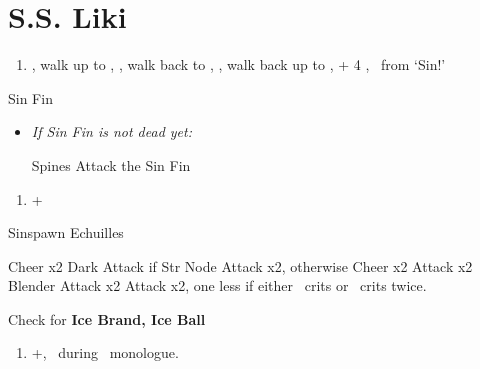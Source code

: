 \chapter{S.S. Liki}

\begin{enumerate}
    \item \cs[2:00], walk up to \yuna, \sd, walk back to \wakka, \sd, walk back up to \yuna, \cs + 4 \skippablefmv[4:20], \sd\ from `Sin!'
\end{enumerate}
\begin{battle}[2000]{Sin Fin}
    \begin{itemize}
        \tidusf Defend
        \switch{\yuna}{\lulu}
        \luluf Thunder the Sin Fin
        \switch{\kimahri}{\yuna}
        \summon{\valefor}
        \valeforf Energy Ray \od\ on Sin Fin
        \enemyf Move x2 and Spines x2
        \valeforf Thunder the Sin Fin
        \enemyf Spines and Move
        \valeforf Thunder the Sin Fin x2
        \item \textit{If Sin Fin is not dead yet:}
        \begin{itemize}
            \enemyf Spines
            \switch{\tidus}{\wakka}
            \wakkaf Attack the Sin Fin
        \end{itemize}
    \end{itemize}
\end{battle}
\begin{enumerate}[resume]
    \item \fmv+\cs[1:40]
\end{enumerate}
\begin{battle}[2000]{Sinspawn Echuilles}
    \begin{itemize}
        \tidusf Cheer x2
        \wakkaf Dark Attack
        \tidusf if Str Node Attack x2, otherwise Cheer x2
        \wakkaf Attack x2
        \enemyf Blender
        \wakkaf Attack x2
        \tidusf Attack x2, one less if either \tidus\ crits or \wakka\ crits twice.
        \tidusf \od
    \end{itemize}
    Check for \textbf{Ice Brand, Ice Ball}
\end{battle}
\begin{enumerate}[resume]
    \item \skippablefmv+\cs[1:30], \sd\ during \tidus\ monologue.
\end{enumerate}
\wincb\losscb\bothcb\winnpsingle\lossnpsingle\bothnpsingle
